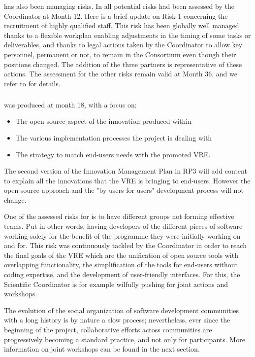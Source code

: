  has also been managing risks. In 
all potential risks had been assessed by the Coordinator at Month 12.
Here is a brief update on Risk 1 concerning the recruitment of highly
qualified staff. This risk has been globally well managed thanks to a
flexible workplan enabling adjustments in the timing of some tasks or
deliverables, and thanks to legal actions taken by the Coordinator to
allow key personnel, permanent or not, to remain in the Consortium
even though their positions changed. The addition of the three
partners is representative of these actions. The assessment for the
other risks remain valid at Month 36, and we refer to
 for details.

\subparagraph{}

 was produced at month 18, with a focus on:

\begin{itemize}
\item{The open source aspect of the innovation produced within \ODK}
\item{The various implementation processes the project is dealing with}
\item{The strategy to match end-users needs with the promoted VRE}.
\end{itemize}

The second version of the Innovation Management Plan in RP3 will add content
to explain all the innovations that the VRE is bringing to end-users.
However the open source approach and the "by users for users"
development process will not change.

One of the assessed risks for
\ODK is to have different groups not forming effective teams. Put in
other words, having developers of the different pieces of software
working solely for the benefit of the programme they were initially
working on and for. This risk was continuously tackled by the
Coordinator in order to reach the final goals of the VRE which are the
unification of open source tools with overlapping functionality, the
simplification of the tools for end-users without coding expertise,
and the development of user-friendly interfaces. For this, the
Scientific Coordinator is for example wilfully pushing for joint
actions and workshops.

The evolution of the social organization of software development
communities with a long history is by nature a slow process;
nevertheless, ever since the beginning of the project, collaborative
efforts across communities are progressively becoming a standard
practice, and not only for \ODK participants. More information on
joint workshops can be found in the next section.


